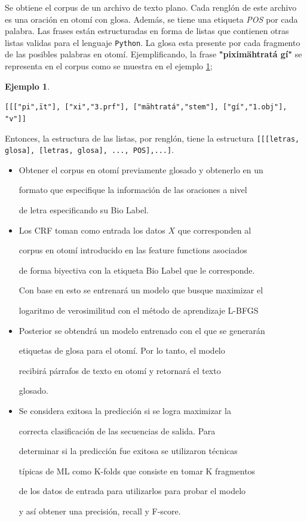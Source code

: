 \documentclass[letterpaper,12pt,oneside]{book}
\def\code#1{\texttt{#1}}
\theoremstyle{definition}
\newtheorem{exmp}{Ejemplo}[section]
\begin{document}
	
	Se obtiene el corpus de un archivo de texto plano. Cada renglón de este archivo es una oración en otomí con glosa. Además, se tiene una etiqueta \textit{POS} por cada palabra. Las frases están estructuradas en forma de listas que contienen otras listas validas para el lenguaje \code{Python}. La glosa esta presente por cada fragmento de las posibles palabras en otomí. Ejemplificando, la frase \textbf{"piximähtratá gí"} se representa en el corpus como se muestra en el ejemplo \ref{exmp:frase_glosada};

	
	\begin{exmp} \label{exmp:frase_glosada}

		\code{[[["pi",\"it"], ["xi","3.prf"], ["mähtratá","stem"], ["gí","1.obj"], "v"]]}

	\end{exmp}

	
	Entonces, la estructura de las listas, por renglón, tiene la estructura \code{[[[letras, glosa], [letras, glosa], ..., POS],...]}.


	
	\begin{itemize}

		\item Obtener el corpus en otomí previamente glosado y obtenerlo en un

		formato que especifique la información de las oraciones a nivel

		de letra especificando su Bio Label.

		\item Los CRF toman como entrada los datos $X$ que corresponden al

		corpus en otomí introducido en las feature functions asociados

		de forma biyectiva con la etiqueta Bio Label que le corresponde.

		Con base en esto se entrenará un modelo que busque maximizar el

		logaritmo de verosimilitud con el método de aprendizaje L-BFGS

		\item Posterior se obtendrá un modelo entrenado con el que se generarán

		etiquetas de glosa para el otomí. Por lo tanto, el modelo

		recibirá párrafos de texto en otomí y retornará el texto

		glosado.

		\item Se considera exitosa la predicción si se logra maximizar la

		correcta clasificación de las secuencias de salida. Para

		determinar si la predicción fue exitosa se utilizaron técnicas

		típicas de ML como K-folds que consiste en tomar K fragmentos

		de los datos de entrada para utilizarlos para probar el modelo

		y así obtener una precisión, recall y F-score.

	\end{itemize}
\end{document}
